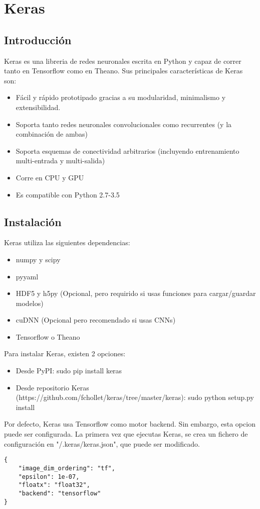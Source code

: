 \chapter{Keras}
\section{Introducción}
Keras es una libreria de redes neuronales escrita en Python y capaz de correr tanto en Tensorflow como en Theano. Sus principales características de Keras son:
\begin{itemize}[noitemsep]
\item Fácil y rápido prototipado gracias a su modularidad, minimalismo y extensibilidad.
\item Soporta tanto redes neuronales convolucionales como recurrentes (y la combinación de ambas)
\item Soporta esquemas de conectividad arbitrarios (incluyendo entrenamiento multi-entrada y multi-salida)
\item Corre en CPU y GPU
\item Es compatible con Python 2.7-3.5
 \end{itemize}

 \section{Instalación}
 Keras utiliza las siguientes dependencias:
 \begin{itemize}[noitemsep]
\item numpy y scipy
\item pyyaml
\item HDF5 y h5py (Opcional, pero requirido si usas funciones para cargar/guardar modelos)
\item cuDNN (Opcional pero recomendado si usas CNNs)
\item Tensorflow o Theano
 \end{itemize}
 Para instalar Keras, existen 2 opciones:
 \begin{itemize}[noitemsep]
 \item Desde PyPI: sudo pip install keras
 \item Desde repositorio Keras (https://github.com/fchollet/keras/tree/master/keras): sudo python setup.py install
 \end{itemize}
 Por defecto, Keras usa Tensorflow como motor backend. Sin embargo, esta opcion puede ser configurada. La primera vez que ejecutas Keras, se crea un fichero de configuración en "/.keras/keras.json", que puede ser modificado.
\begin{verbatim}
{
    "image_dim_ordering": "tf",
    "epsilon": 1e-07,
    "floatx": "float32",
    "backend": "tensorflow"
}
\end{verbatim}
 
